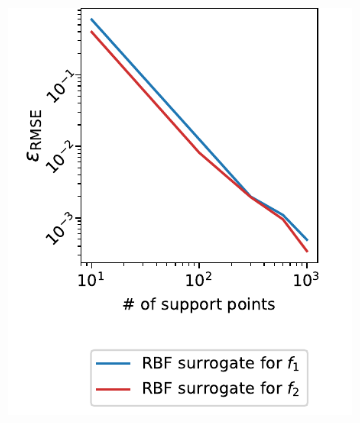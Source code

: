\documentclass[
  a4paper,  %
  twoside,  %
  bibliography=totoc,
  headsepline,
  cleardoublepage=empty,
  parskip=half,
  draft=false
]{scrbook}
\begin{document}
\begin{mdframed}[style=style]
\begin{figure}[H]
\begin{subfigure}{.5\textwidth}
  \includegraphics[width=\linewidth]{graphics/grid_approx_f1}
  \label{fig:grid_approx_f1}
\vspace{2.5mm}
\end{subfigure}%
\begin{subfigure}{.5\textwidth}

\end{subfigure}
\end{figure}
\end{mdframed}
\end{document}
